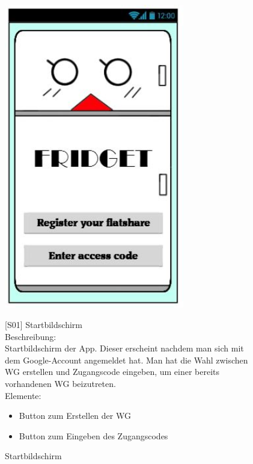 \documentclass[a4paper]{scrreprt}
\begin{document}
        \begin{figure}[h]
        	\begin{minipage}[b]{0.4\linewidth}
        		
        		\flushright
        		\centering
        		\includegraphics[width=0.7\textwidth]{fridget_start.JPG}
        		\caption{Startbildschirm}
        		\label{fig:figure1}
        	\end{minipage}
        	\hspace{0.5cm}
        	\begin{minipage}[b]{0.55\linewidth}
        		\flushleft
        		{[}S01{]} Startbildschirm \\
        		
        		Beschreibung: \\
        		Startbildschirm der App. Dieser erscheint nachdem man sich mit dem Google-Account angemeldet hat. Man hat die Wahl zwischen WG erstellen und Zugangscode eingeben, um einer bereits vorhandenen WG beizutreten.
        		\\
        		Elemente:
        		\begin{itemize}
        		\renewcommand\labelitemi{--}
        		\item Button zum Erstellen der WG
        		\item Button zum Eingeben des Zugangscodes
        		\end{itemize}
        		

\end{minipage}
\end{figure}
\end{document}
